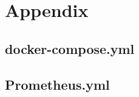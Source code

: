 \section{Appendix}

\subsection{docker-compose.yml}\label{appendix:docker-compose}


\newpage

\subsection{Prometheus.yml}\label{appendix:prometheus-config}
